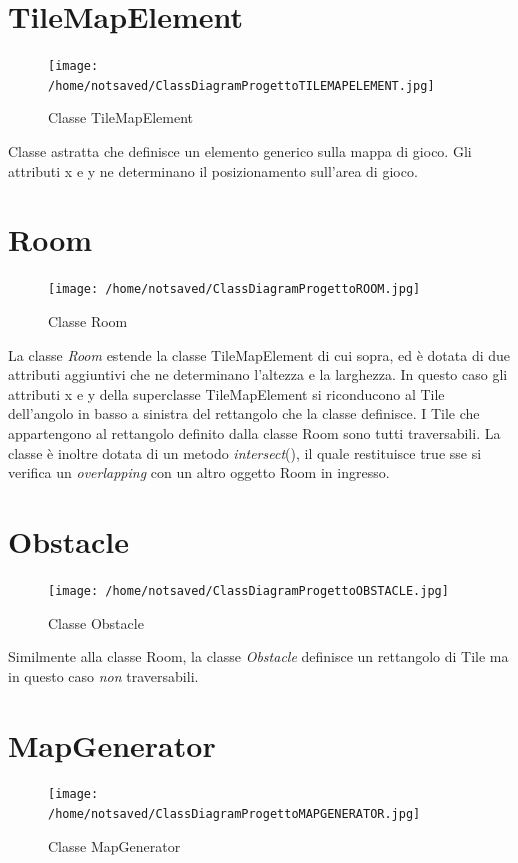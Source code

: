 \documentclass[12pt]{book}
\begin{document}
\section{TileMapElement}
\begin{figure}[H]
\centering
\texttt{[image: /home/notsaved/ClassDiagramProgettoTILEMAPELEMENT.jpg]}
\caption{Classe TileMapElement}
\label{tilemapelement}
\end{figure}

Classe astratta che definisce un elemento generico sulla mappa di gioco. Gli attributi x e y ne determinano il posizionamento sull'area di gioco.

\section{Room}

\begin{figure}[H]
\centering
\texttt{[image: /home/notsaved/ClassDiagramProgettoROOM.jpg]}
\caption{Classe Room}
\label{classroom}
\end{figure}

La classe \emph{Room} estende la classe TileMapElement di cui sopra, ed \`e dotata di due attributi aggiuntivi che ne determinano l'altezza e la larghezza. In questo caso gli attributi x e y della superclasse TileMapElement si riconducono al Tile dell'angolo in basso a sinistra del rettangolo che la classe definisce. I Tile che appartengono al rettangolo definito dalla classe Room sono tutti traversabili. La classe \`e inoltre dotata di un metodo \emph{intersect}(), il quale restituisce true sse si verifica un \emph{overlapping} con un altro oggetto Room in ingresso.

\section{Obstacle}
\begin{figure}[H]
\centering
\texttt{[image: /home/notsaved/ClassDiagramProgettoOBSTACLE.jpg]}
\caption{Classe Obstacle}
\label{classobstacle}
\end{figure}

Similmente alla classe Room, la classe \emph{Obstacle} definisce un rettangolo di Tile ma in questo caso \emph{non} traversabili.

\section{MapGenerator}
\begin{figure}[H]
\centering
\texttt{[image: /home/notsaved/ClassDiagramProgettoMAPGENERATOR.jpg]}
\caption{Classe MapGenerator}
\label{classmapgenerator}
\end{figure}
\end{document}
